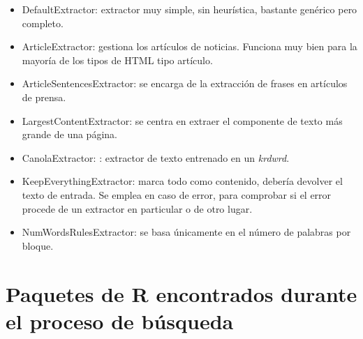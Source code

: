 \begin{itemize}
  \item DefaultExtractor: extractor muy simple, sin heurística, bastante genérico pero completo.
  \item ArticleExtractor: gestiona los artículos de noticias. Funciona muy bien para la mayoría de los 
  tipos de HTML tipo artículo.
  \item ArticleSentencesExtractor: se encarga de la extracción de frases en artículos de prensa.
  \item LargestContentExtractor: se centra en extraer el componente de texto más grande de una página. 
  \item CanolaExtractor: : extractor de texto entrenado en un \emph{krdwrd}.
  \item KeepEverythingExtractor: marca todo como contenido, debería devolver el texto de entrada. Se emplea 
  en caso de error, para comprobar si el error procede de un extractor en particular o de otro lugar.
  \item NumWordsRulesExtractor: se basa únicamente en el número de palabras por bloque.
\end{itemize}

\section{Paquetes de R encontrados durante el proceso de búsqueda}
\label{sec:paquetes de r encontrados durante el proceso de busqueda}
